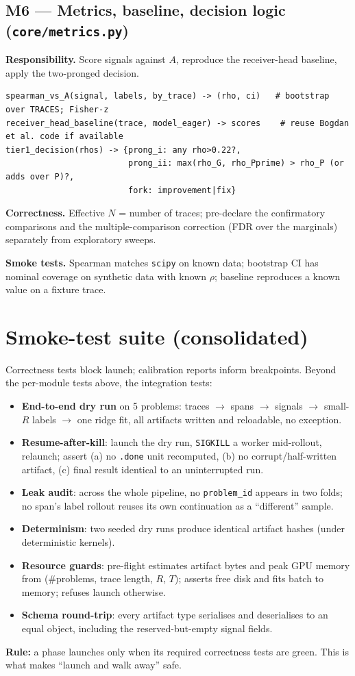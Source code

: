 \documentclass[11pt]{article}
\begin{document}
\subsection{M6 --- Metrics, baseline, decision logic (\texttt{core/metrics.py})}
\textbf{Responsibility.} Score signals against $A$, reproduce the receiver-head baseline, apply the
two-pronged decision.
\begin{lstlisting}
spearman_vs_A(signal, labels, by_trace) -> (rho, ci)   # bootstrap over TRACES; Fisher-z
receiver_head_baseline(trace, model_eager) -> scores    # reuse Bogdan et al. code if available
tier1_decision(rhos) -> {prong_i: any rho>0.22?,
                         prong_ii: max(rho_G, rho_Pprime) > rho_P (or adds over P)?,
                         fork: improvement|fix}
\end{lstlisting}
\textbf{Correctness.} Effective $N$ = number of traces; pre-declare the confirmatory comparisons and the
multiple-comparison correction (FDR over the marginals) separately from exploratory sweeps.

\textbf{Smoke tests.} Spearman matches \texttt{scipy} on known data; bootstrap CI has nominal coverage on
synthetic data with known $\rho$; baseline reproduces a known value on a fixture trace.

\section{Smoke-test suite (consolidated)}
\label{sec:smoke}
Correctness tests block launch; calibration reports inform breakpoints. Beyond the per-module tests
above, the integration tests:
\begin{itemize}
\item \textbf{End-to-end dry run} on 5 problems: traces $\to$ spans $\to$ signals $\to$ small-$R$ labels
$\to$ one ridge fit, all artifacts written and reloadable, no exception.
\item \textbf{Resume-after-kill}: launch the dry run, \texttt{SIGKILL} a worker mid-rollout, relaunch;
assert (a) no \texttt{.done} unit recomputed, (b) no corrupt/half-written artifact, (c) final result
identical to an uninterrupted run.
\item \textbf{Leak audit}: across the whole pipeline, no \texttt{problem\_id} appears in two folds; no
span's label rollout reuses its own continuation as a ``different'' sample.
\item \textbf{Determinism}: two seeded dry runs produce identical artifact hashes (under deterministic
kernels).
\item \textbf{Resource guards}: pre-flight estimates artifact bytes and peak GPU memory from
(\#problems, trace length, $R$, $T$); asserts free disk and fits batch to memory; refuses launch
otherwise.
\item \textbf{Schema round-trip}: every artifact type serialises and deserialises to an equal object,
including the reserved-but-empty signal fields.
\end{itemize}
\textbf{Rule:} a phase launches only when its required correctness tests are green. This is what makes
``launch and walk away'' safe.
\end{document}
